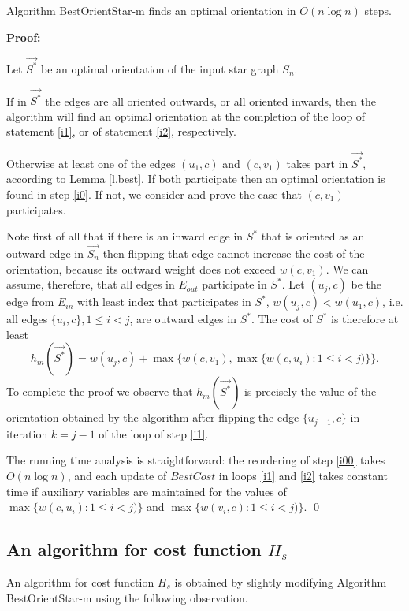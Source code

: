 \begin{theorem}
Algorithm BestOrientStar-m finds an optimal orientation in  $O(n \log n)$ steps.
\end{theorem}  

\noindent \textbf{Proof:}

 Let $\vec{S^*}$ be an optimal orientation of the input star graph $S_n$.
 
 If in $\vec{S^*}$ the edges are all oriented outwards, or all oriented 
 inwards, then the algorithm will find an optimal orientation
 at the completion of the loop of statement \ref{i1}, or
of statement \ref{i2}, respectively.
 
 Otherwise at least one of the edges $(u_1,c)$ and $(c,v_1)$ takes part 
 in $\vec{S^*}$, according to Lemma \ref{l.best}. If both participate then an optimal orientation is found in step \ref{i0}.
 If not, we consider and prove the case that $(c,v_1)$ participates. 
 
 Note first of all that if there is an inward edge in $S^*$ that is oriented as
 an outward edge in $\vec{S_n}$ then flipping that edge cannot
 increase the cost of the orientation, because its outward weight does not exceed $w(c,v_1)$.
 We can assume, therefore, that all edges in $E_{out}$ participate in $S^*$. 
 Let $(u_j,c)$ be the 
 edge from $E_{in}$ with least index that participates in $S^*$, 
  $w(u_j,c)<w(u_1,c)$, i.e. all edges $\{u_i,c\}, 1\leq i<j$, are outward edges in $S^*$. 
 The cost of $S^*$ is therefore at least
 $$h_m(\vec{S^*})=w(u_j,c)+\max \{w(c,v_1),\max \{w(c,u_i):1\leq i<j)\}\}.$$
To complete the proof we observe that $h_m(\vec{S^*})$ is precisely the value of the orientation
obtained by the algorithm after flipping the edge  $\{u_{j-1},c\}$
 in iteration $k=j-1$ of the loop of step \ref{i1}.

The running time  analysis is straightforward: the reordering of step \ref{i00} takes
$O(n \log n)$, and each update of $BestCost$ in loops \ref{i1} and \ref{i2} takes 
constant time if  auxiliary variables are maintained for the values of 
$\max \{w(c,u_i):1\leq i<j)\}$ and $\max \{w(v_i,c):1\leq i<j)\}$.
 \qed
 
  \subsection{An algorithm for cost function $H_s$}
  An algorithm for cost function $H_s$ is obtained by slightly modifying Algorithm BestOrientStar-m using the following observation.
  
